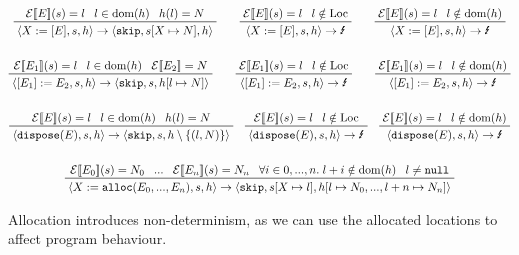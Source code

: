 \documentclass[a4paper, 11pt]{article}
\newcommand{\interp}[2][]{\mathcal{#1}[\![#2]\!]}
\newcommand{\lightning}{\text{\Lightning}}
\begin{document}
{    \begin{gather*}
    \prftree[r]{}
    {\interp[E]{E}(s) = l}
    {l \in \text{dom}(h)}
    {h(l) = N}
    {\langle X:=[E], s, h \rangle \rightarrow \langle \texttt{skip}, s[X\mapsto N], h \rangle}
    \qquad
    \prftree[r]{}
    {\interp[E]{E}(s) = l}
    {l \notin \text{Loc}}
    {\langle X:=[E], s, h \rangle \rightarrow \lightning}
    \qquad
    \prftree[r]{}
    {\interp[E]{E}(s) = l}
    {l \notin \text{dom}(h)}
    {\langle X:=[E], s, h \rangle \rightarrow \lightning}
    \\
    \\
    \prftree[r]{}
    {\interp[E]{E_1}(s) = l}
    {l \in \text{dom}(h)}
    {\interp[E]{E_2} = N}
    {\langle [E_1]:=E_2, s, h \rangle \rightarrow \langle \texttt{skip}, s, h[l \mapsto N] \rangle}
    \qquad
    \prftree[r]{}
    {\interp[E]{E_1}(s) = l}
    {l\notin\text{Loc}}
    {\langle [E_1]:=E_2, s, h \rangle \rightarrow \lightning}
    \qquad
    \prftree[r]{}
    {\interp[E]{E_1}(s) = l}
    {l \notin \text{dom}(h)}
    {\langle [E_1]:=E_2, s, h \rangle \rightarrow \lightning}
    \\
    \\
    \prftree[r]{}
    {\interp[E]{E}(s) = l}
    {l \in \text{dom}(h)}
    {h(l) = N}
    {\langle \texttt{dispose}(E), s, h \rangle \rightarrow \langle \texttt{skip}, s, h\setminus\{(l, N)\} \rangle}
    \quad
    \prftree[r]{}
    {\interp[E]{E}(s) = l}
    {l\notin\text{Loc}}
    {\langle \texttt{dispose}(E), s, h \rangle \rightarrow \lightning}
    \quad
    \prftree[r]{}
    {\interp[E]{E}(s) = l}
    {l \notin \text{dom}(h)}
    {\langle \texttt{dispose}(E), s, h \rangle \rightarrow \lightning}
    \\
    \\
    \prftree[r]{}
    {\interp[E]{E_0}(s) = N_0}
    {...}
    {\interp[E]{E_n}(s) = N_n}
    {\forall i \in {0,...,n}.\;l+i \notin \text{dom}(h)}
    {l\neq\texttt{null}}
    {\langle X:=\texttt{alloc}(E_0,...,E_n), s, h \rangle \rightarrow \langle \texttt{skip}, s[X\mapsto l], h[l\mapsto N_0, ..., l+n\mapsto N_n] \rangle}
    \end{gather*}

    Allocation introduces non-determinism, as we can use the allocated locations to affect program behaviour.
}
\end{document}
